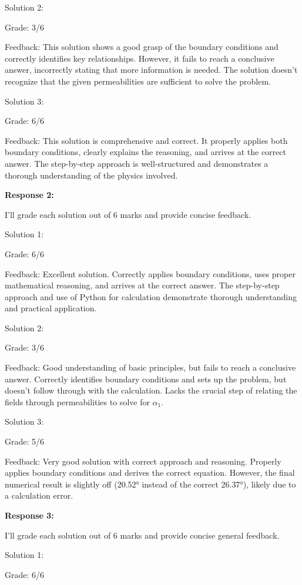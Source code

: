 \documentclass[a4paper,11pt]{article}
\begin{document}
Solution 2:

Grade: 3/6

Feedback: This solution shows a good grasp of the boundary conditions and correctly identifies key relationships. However, it fails to reach a conclusive answer, incorrectly stating that more information is needed. The solution doesn't recognize that the given permeabilities are sufficient to solve the problem.

Solution 3:

Grade: 6/6

Feedback: This solution is comprehensive and correct. It properly applies both boundary conditions, clearly explains the reasoning, and arrives at the correct answer. The step-by-step approach is well-structured and demonstrates a thorough understanding of the physics involved.

\bigskip
\textbf{Response 2:}

I'll grade each solution out of 6 marks and provide concise feedback.

Solution 1:

Grade: 6/6

Feedback: Excellent solution. Correctly applies boundary conditions, uses proper mathematical reasoning, and arrives at the correct answer. The step-by-step approach and use of Python for calculation demonstrate thorough understanding and practical application.

Solution 2:

Grade: 3/6

Feedback: Good understanding of basic principles, but fails to reach a conclusive answer. Correctly identifies boundary conditions and sets up the problem, but doesn't follow through with the calculation. Lacks the crucial step of relating the fields through permeabilities to solve for \(\alpha_1\).

Solution 3:

Grade: 5/6

Feedback: Very good solution with correct approach and reasoning. Properly applies boundary conditions and derives the correct equation. However, the final numerical result is slightly off (20.52° instead of the correct 26.37°), likely due to a calculation error.

\bigskip
\textbf{Response 3:}

I'll grade each solution out of 6 marks and provide concise general feedback.

Solution 1:

Grade: 6/6
\end{document}
